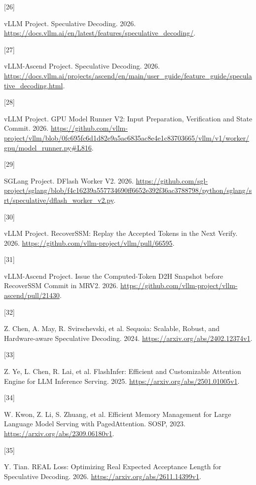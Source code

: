 \documentclass[
  a4paper,
  UTF8,
  fontset=none,
  zihao=5]{ctexart}
\newlength{\cslhangindent}
\newlength{\csllabelwidth}
\newenvironment{CSLReferences}[2] %
 {\begin{list}{}{%
  \setlength{\itemindent}{0pt}
  \setlength{\leftmargin}{0pt}
  \setlength{\parsep}{0pt}
  \ifodd #1
   \setlength{\leftmargin}{\cslhangindent}
   \setlength{\itemindent}{-1\cslhangindent}
  \fi
  \setlength{\itemsep}{#2\baselineskip}}}
 {\end{list}}
\newcommand{\CSLLeftMargin}[1]{\parbox[t]{\csllabelwidth}{\strut#1\strut}}
\newcommand{\CSLRightInline}[1]{\parbox[t]{\linewidth - \csllabelwidth}{\strut#1\strut}}
\begin{document}
\begin{CSLReferences}{0}{0}
\CSLLeftMargin{{[}26{]} }%
\CSLRightInline{vLLM Project. {Speculative Decoding}. 2026.
\url{https://docs.vllm.ai/en/latest/features/speculative_decoding/}.}

\CSLLeftMargin{{[}27{]} }%
\CSLRightInline{vLLM-Ascend Project. {Speculative Decoding}. 2026.
\url{https://docs.vllm.ai/projects/ascend/en/main/user_guide/feature_guide/speculative_decoding.html}.}

\CSLLeftMargin{{[}28{]} }%
\CSLRightInline{vLLM Project. {GPU Model Runner V2: Input Preparation,
Verification and State Commit}. 2026.
\url{https://github.com/vllm-project/vllm/blob/0fc695fc6d1d82e9a5ac6835ac8e4e1c83703665/vllm/v1/worker/gpu/model_runner.py\#L816}.}

\CSLLeftMargin{{[}29{]} }%
\CSLRightInline{SGLang Project. {DFlash Worker V2}. 2026.
\url{https://github.com/sgl-project/sglang/blob/f4c16239a557734690ff6652e392f36ac3788798/python/sglang/srt/speculative/dflash_worker_v2.py}.}

\CSLLeftMargin{{[}30{]} }%
\CSLRightInline{vLLM Project. {RecoverSSM: Replay the Accepted Tokens in
the Next Verify}. 2026.
\url{https://github.com/vllm-project/vllm/pull/66595}.}

\CSLLeftMargin{{[}31{]} }%
\CSLRightInline{vLLM-Ascend Project. {Issue the Computed-Token D2H
Snapshot before RecoverSSM Commit in MRV2}. 2026.
\url{https://github.com/vllm-project/vllm-ascend/pull/21430}.}

\CSLLeftMargin{{[}32{]} }%
\CSLRightInline{Z. Chen, A. May, R. Svirschevski, et al. {Sequoia:
Scalable, Robust, and Hardware-aware Speculative Decoding}. 2024.
\url{https://arxiv.org/abs/2402.12374v1}.}

\CSLLeftMargin{{[}33{]} }%
\CSLRightInline{Z. Ye, L. Chen, R. Lai, et al. {FlashInfer: Efficient
and Customizable Attention Engine for LLM Inference Serving}. 2025.
\url{https://arxiv.org/abs/2501.01005v1}.}

\CSLLeftMargin{{[}34{]} }%
\CSLRightInline{W. Kwon, Z. Li, S. Zhuang, et al. {Efficient Memory
Management for Large Language Model Serving with PagedAttention}. SOSP,
2023. \url{https://arxiv.org/abs/2309.06180v1}.}

\CSLLeftMargin{{[}35{]} }%
\CSLRightInline{Y. Tian. {REAL Loss: Optimizing Real Expected Acceptance
Length for Speculative Decoding}. 2026.
\url{https://arxiv.org/abs/2611.14399v1}.}


\end{CSLReferences}
\end{document}
